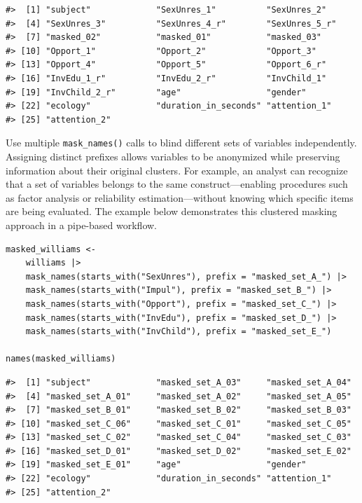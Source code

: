 \begin{verbatim}
#>  [1] "subject"             "SexUnres_1"          "SexUnres_2"         
#>  [4] "SexUnres_3"          "SexUnres_4_r"        "SexUnres_5_r"       
#>  [7] "masked_02"           "masked_01"           "masked_03"          
#> [10] "Opport_1"            "Opport_2"            "Opport_3"           
#> [13] "Opport_4"            "Opport_5"            "Opport_6_r"         
#> [16] "InvEdu_1_r"          "InvEdu_2_r"          "InvChild_1"         
#> [19] "InvChild_2_r"        "age"                 "gender"             
#> [22] "ecology"             "duration_in_seconds" "attention_1"        
#> [25] "attention_2"
\end{verbatim}

Use multiple \texttt{mask\_names()} calls to blind different sets of variables independently. Assigning distinct prefixes allows variables to be anonymized while preserving information about their original clusters. For example, an analyst can recognize that a set of variables belongs to the same construct---enabling procedures such as factor analysis or reliability estimation---without knowing which specific items are being evaluated. The example below demonstrates this clustered masking approach in a pipe-based workflow.

\begin{verbatim}
masked_williams <- 
    williams |> 
    mask_names(starts_with("SexUnres"), prefix = "masked_set_A_") |>  
    mask_names(starts_with("Impul"), prefix = "masked_set_B_") |> 
    mask_names(starts_with("Opport"), prefix = "masked_set_C_") |> 
    mask_names(starts_with("InvEdu"), prefix = "masked_set_D_") |> 
    mask_names(starts_with("InvChild"), prefix = "masked_set_E_")

names(masked_williams)
\end{verbatim}

\begin{verbatim}
#>  [1] "subject"             "masked_set_A_03"     "masked_set_A_04"    
#>  [4] "masked_set_A_01"     "masked_set_A_02"     "masked_set_A_05"    
#>  [7] "masked_set_B_01"     "masked_set_B_02"     "masked_set_B_03"    
#> [10] "masked_set_C_06"     "masked_set_C_01"     "masked_set_C_05"    
#> [13] "masked_set_C_02"     "masked_set_C_04"     "masked_set_C_03"    
#> [16] "masked_set_D_01"     "masked_set_D_02"     "masked_set_E_02"    
#> [19] "masked_set_E_01"     "age"                 "gender"             
#> [22] "ecology"             "duration_in_seconds" "attention_1"        
#> [25] "attention_2"
\end{verbatim}

